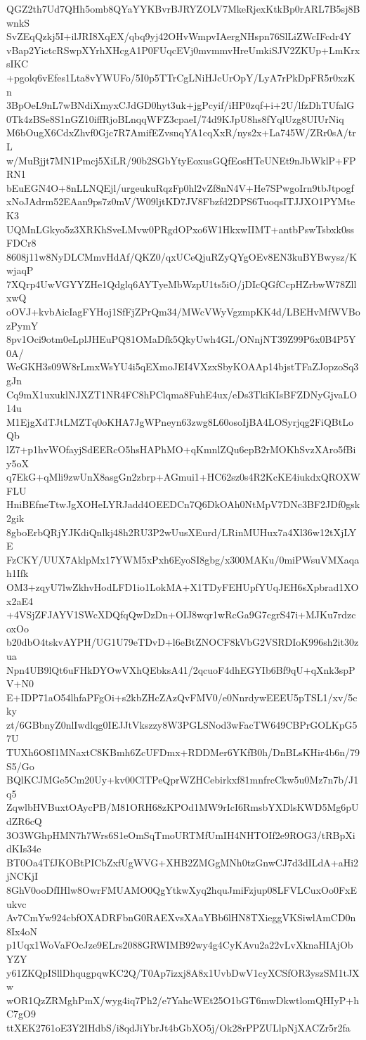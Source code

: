 QGZ2th7Ud7QHh5omb8QYaYYKBvrBJRYZOLV7MkeRjexKtkBp0rARL7B5sj8BwnkS
SvZEqQzkj5I+ilJRI8XqEX/qbq9yj42OHvWmpvIAergNHspn76SlLiZWcIFcdr4Y
vBap2YictcRSwpXYrhXHcgA1P0FUqcEVj0mvmmvHreUmkiSJV2ZKUp+LmKrxsIKC
+pgolq6vEfes1Lta8vYWUFo/5I0p5TTrCgLNiHJcUrOpY/LyA7rPkDpFR5r0xzKn
3BpOeL9nL7wBNdiXmyxCJdGD0hyt3uk+jgPcyif/iHP0zqf+i+2U/lfzDhTUfalG
0Tk4zBSe8S1nGZ10iffRjoBLnqqWFZ3cpaeI/74d9KJpU8hs8fYqlUzg8UIUrNiq
M6bOugX6CdxZhvf0Gjc7R7AmifEZvsnqYA1cqXxR/nys2x+La745W/ZRr0sA/trL
w/MuBjjt7MN1Pmcj5XiLR/90b2SGbYtyEoxusGQfEosHTeUNEt9nJbWklP+FPRN1
bEuEGN4O+8nLLNQEjl/urgeukuRqzFp0hl2vZf8nN4V+He7SPwgoIrn9tbJtpogf
xNoJAdrm52EAan9ps7z0mV/W09ljtKD7JV8Fbzfd2DPS6TuoqsITJJXO1PYMteK3
UQMnLGkyo5z3XRKhSveLMvw0PRgdOPxo6W1HkxwIIMT+antbPswTsbxk0ssFDCr8
8608j11w8NyDLCMmvHdAf/QKZ0/qxUCeQjuRZyQYgOEv8EN3kuBYBwysz/KwjaqP
7XQrp4UwVGYYZHe1Qdglq6AYTyeMbWzpU1ts5iO/jDIcQGfCcpHZrbwW78ZllxwQ
oOVJ+kvbAicIagFYHoj1SfFjZPrQm34/MWcVWyVgzmpKK4d/LBEHvMfWVBozPymY
8pv1Oci9otm0eLplJHEuPQ81OMaDfk5QkyUwh4GL/ONnjNT39Z99P6x0B4P5Y0A/
WeGKH3s09W8rLmxWsYU4i5qEXmoJEI4VXzxSbyKOAAp14bjstTFaZJopzoSq3gJn
Cq9mX1uxuklNJXZT1NR4FC8hPClqma8FuhE4ux/eDs3TkiKIsBFZDNyGjvaLO14u
M1EjgXdTJtLMZTq0oKHA7JgWPneyn63zwg8L60osoIjBA4LOSyrjqg2FiQBtLoQb
lZ7+p1hvWOfayjSdEERcO5hsHAPhMO+qKmnlZQu6epB2rMOKhSvzXAro5fBiy5oX
q7EkG+qMli9zwUnX8asgGn2zbrp+AGmui1+HC62sz0s4R2KcKE4iukdxQROXWFLU
HniBEfneTtwJgXOHeLYRJadd4OEEDCn7Q6DkOAh0NtMpV7DNc3BF2JDf0gsk2gik
8gboErbQRjYJKdiQnlkj48h2RU3P2wUusXEurd/LRinMUHux7a4Xl36w12tXjLYE
FzCKY/UUX7AklpMx17YWM5xPxh6EyoSI8gbg/x300MAKu/0miPWsuVMXaqah1Ifk
OM3+zqyU7lwZkhvHodLFD1io1LokMA+X1TDyFEHUpfYUqJEH6sXpbrad1XOx2aE4
+4VSjZFJAYV1SWcXDQfqQwDzDn+OIJ8wqr1wRcGa9G7cgrS47i+MJKu7rdzcoxOo
b20dbO4tskvAYPH/UG1U79eTDvD+l6eBtZNOCF8kVbG2VSRDIoK996sh2it30zua
Npn4UB9lQt6uFHkDYOwVXhQEbksA41/2qcuoF4dhEGYIb6Bf9qU+qXnk3spPV+N0
E+IDP71aO54lhfaPFgOi+s2kbZHcZAzQvFMV0/e0NnrdywEEEU5pTSL1/xv/5cky
zt/6GBbnyZ0nlIwdlqg0IEJJtVkszzy8W3PGLSNod3wFacTW649CBPrGOLKpG57U
TUXh6O8I1MNaxtC8KBmh6ZcUFDmx+RDDMer6YKfB0h/DnBLsKHir4b6n/79S5/Go
BQlKCJMGe5Cm20Uy+kv00ClTPeQprWZHCebirkxf81mnfrcCkw5u0Mz7n7b/J1q5
ZqwlbHVBuxtOAycPB/M81ORH68zKPOd1MW9rIcI6RmsbYXDlsKWD5Mg6pUdZR6cQ
3O3WGhpHMN7h7Wrs6S1eOmSqTmoURTMfUmIH4NHTOIf2e9ROG3/tRBpXidKIs34e
BT0Oa4TfJKOBtPICbZxfUgWVG+XHB2ZMGgMNh0tzGnwCJ7d3dILdA+aHi2jNCKjI
8GhV0ooDfIHlw8OwrFMUAMO0QgYtkwXyq2hquJmiFzjup08LFVLCuxOo0FxEukvc
Av7CmYw924cbfOXADRFbnG0RAEXvsXAaYBb6lHN8TXieggVKSiwlAmCD0n8Ix4oN
p1Uqx1WoVaFOcJze9ELrs2088GRWIMB92wy4g4CyKAvu2a22vLvXknaHIAjObYZY
y61ZKQpISllDhqugpqwKC2Q/T0Ap7izxj8A8x1UvbDwV1cyXCSfOR3yszSM1tJXw
wOR1QzZRMghPmX/wyg4iq7Ph2/e7YahcWEt25O1bGT6mwDkwtlomQHIyP+hC7gO9
ttXEK2761oE3Y2IHdbS/i8qdJiYbrJt4bGbXO5j/Ok28rPPZULlpNjXACZr5r2fa
